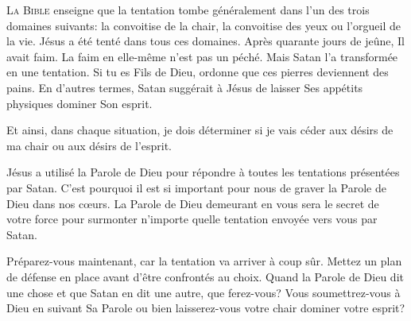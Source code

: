 





\lettrine[findent=-0.1em]{L}{a Bible} enseigne que la tentation  tombe généralement
 dans l'un des trois domaines suivants: la convoitise de la chair,
 la convoitise des yeux ou l'orgueil de la vie. Jésus a été tenté
 dans tous ces domaines. Après quarante jours de jeûne, Il avait faim.
 La faim en elle-même n'est pas un péché. Mais Satan l'a transformée
 en une tentation. \Og Si tu es Fils de Dieu, ordonne que ces pierres
 deviennent des pains. \Fg{} 
 En d'autres termes, Satan suggérait à Jésus de laisser
 Ses appétits physiques dominer Son esprit. 


Et ainsi, dans chaque situation, je dois déterminer si je vais céder
 aux désirs de ma chair ou aux désirs de l'esprit. 

Jésus a utilisé la Parole de Dieu pour répondre à toutes les tentations
 présentées par Satan. C'est pourquoi il est si important pour nous de graver
 la Parole de Dieu dans nos c\oe{}urs. La Parole de Dieu demeurant en vous
 sera le secret de votre force pour surmonter n'importe quelle tentation
 envoyée vers vous par Satan. 

Préparez-vous maintenant, car la tentation va arriver à coup sûr.
 Mettez un plan de défense en place avant d'être confrontés au choix.
 Quand la Parole de Dieu dit une chose et que Satan en dit une autre,
 que ferez-vous? Vous soumettrez-vous à Dieu en suivant Sa Parole
 ou bien laisserez-vous votre chair dominer votre esprit? 

\dvrule



